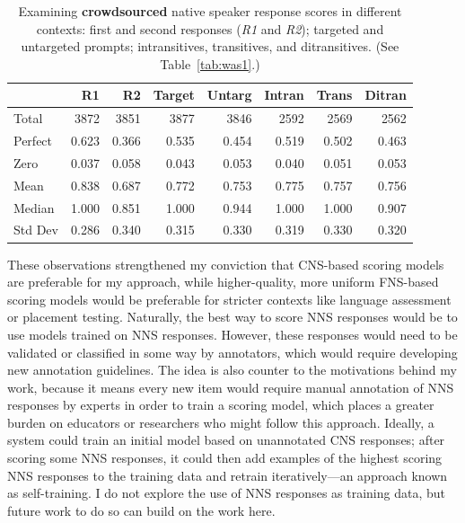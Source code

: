 \begin{table}[htb!]
\begin{center}
\begin{tabular}{|l||r|r||r|r||r|r|r|}
\hline
 & R1 & R2 & Target & Untarg & Intran & Trans & Ditran \\
\hline
\hline
Total & 3872 & 3851 & 3877 & 3846 & 2592 & 2569 & 2562 \\
\hline
\hline
Perfect & 0.623 & 0.366 & 0.535 & 0.454 & 0.519 & 0.502 & 0.463 \\
\hline
Zero  & 0.037 & 0.058 & 0.043 & 0.053 & 0.040 & 0.051 & 0.053  \\
\hline
\hline
Mean  & 0.838 & 0.687 & 0.772 & 0.753 & 0.775 & 0.757 & 0.756  \\
\hline
Median  & 1.000 & 0.851 & 1.000 & 0.944 & 1.000 & 1.000 & 0.907  \\
\hline
Std Dev  & 0.286 & 0.340 & 0.315 & 0.330 & 0.319 & 0.330 & 0.320  \\
\hline
\end{tabular}
\caption{\label{tab:was2} Examining \textbf{crowdsourced} native speaker response scores in different contexts: first and second responses (\textit{R1} and \textit{R2});  targeted and untargeted prompts; intransitives, transitives, and ditransitives. (See Table~\ref{tab:was1}.)}
\end{center}
\end{table}

These observations strengthened my conviction that CNS-based scoring models are preferable for my approach, while higher-quality, more uniform FNS-based scoring models would be preferable for stricter contexts like language assessment or placement testing. Naturally, the best way to score NNS responses would be to use models trained on NNS responses. However, these responses would need to be validated or classified in some way by annotators, which would require developing new annotation guidelines. The idea is also counter to the motivations behind my work, because it means every new item would require manual annotation of NNS responses by experts in order to train a scoring model, which places a greater burden on educators or researchers who might follow this approach. Ideally, a system could train an initial model based on unannotated CNS responses; after scoring some NNS responses, it could then add examples of the highest scoring NNS responses to the training data and retrain iteratively---an approach known as self-training. I do not explore the use of NNS responses as training data, but future work to do so can build on the work here.




